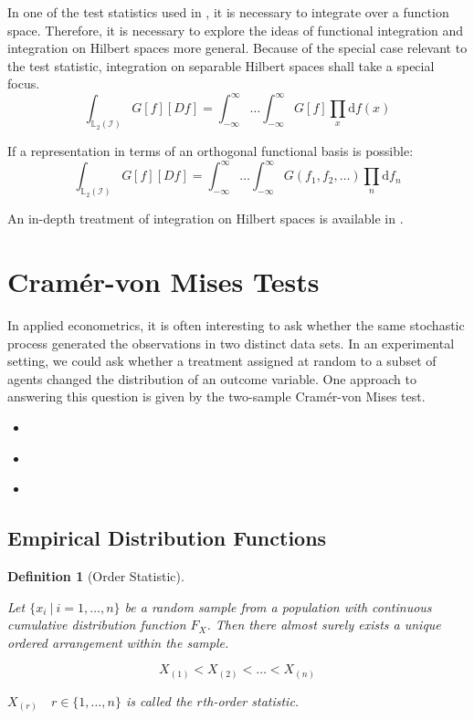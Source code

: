 \documentclass[12pt, a4paper]{article}
\theoremstyle{MAstyle} \newtheorem{assumption}{Assumption}[section]
\theoremstyle{MAstyle} \newtheorem{definition}{Definition}[section]
\begin{document}
			In one of the test statistics used in \cite{bugni_permutation_2021}, it is necessary to integrate over a function space. Therefore, it is necessary to explore the ideas of functional integration and integration on Hilbert spaces more general. Because of the special case relevant to the test statistic, integration on separable Hilbert spaces shall take a special focus.
			\begin{equation}
				\int_{\mathbb{L}_2(\mathcal{I})} G\left[f\right] \left[Df\right] = \int_{-\infty}^{\infty}\dots\int_{-\infty}^{\infty} G\left[f\right] \prod_{x} \mathrm{d}f(x)
			\end{equation}
		
			If a representation in terms of an orthogonal functional basis is possible:
			\begin{equation}
				\int_{\mathbb{L}_2(\mathcal{I})} G\left[f\right] \left[Df\right] = \int_{-\infty}^{\infty}\dots\int_{-\infty}^{\infty} G\left(f_1, f_2, \dots\right) \prod_{n} \mathrm{d}f_n
			\end{equation}
		
			An in-depth treatment of integration on Hilbert spaces is available in \cite{skorohod_integration_1974}.
		
	\section{Cram\'{e}r-von Mises Tests}\label{CvM_Tests}
		In applied econometrics, it is often interesting to ask whether the same stochastic process generated the observations in two distinct data sets. In an experimental setting, we could ask whether a treatment assigned at random to a subset of agents changed the distribution of an outcome variable. 
		One approach to answering this question is given by the two-sample Cram\'{e}r-von Mises test.
		
		\begin{itemize}
			\item \cite{darling_kolmogorov-smirnov_1957}
			\item \cite{anderson_asymptotic_1952}
			\item \cite{buning_nichtparametrische_2013}
		\end{itemize}
	
		\subsection{Empirical Distribution Functions}
			
			\cite{gibbons_nonparametric_2021}
			\begin{definition}[Order Statistic]\label{Order_Stat}
				
				Let $\{x_i \: \vert \: i = 1, \dots , n\}$ be a random sample from a population with continuous cumulative distribution function $F_X$. Then there almost surely exists a unique ordered arrangement within the sample. 
				
				$$X_{(1)} < X_{(2)} < \dots < X_{(n)}$$
				
				$X_{(r)} \quad r \in \{1, \dots, n\}$ is called the $r$th-order statistic.	
			\end{definition}
		
\end{document}
